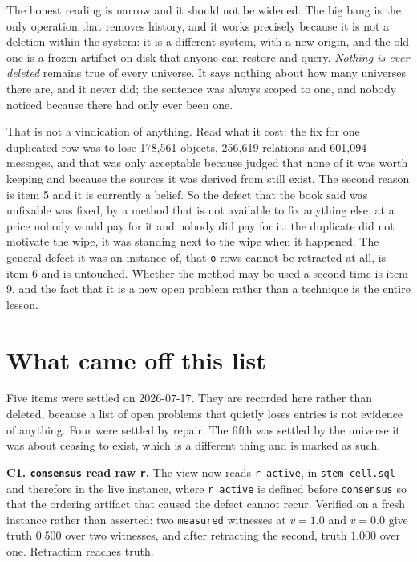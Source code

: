 The honest reading is narrow and it should not be widened. The big bang is the only operation that removes history, and it works precisely because it is not a deletion within the system: it is a different system, with a new origin, and the old one is a frozen artifact on disk that anyone can restore and query. \textit{Nothing is ever deleted} remains true of every universe. It says nothing about how many universes there are, and it never did; the sentence was always scoped to one, and nobody noticed because there had only ever been one.

That is not a vindication of anything. Read what it cost: the fix for one duplicated row was to lose 178,561 objects, 256,619 relations and 601,094 messages, and that was only acceptable because \labPI{} judged that none of it was worth keeping and because the sources it was derived from still exist. The second reason is item 5 and it is currently a belief. So the defect that the book said was unfixable was fixed, by a method that is not available to fix anything else, at a price nobody would pay for it and nobody did pay for it: the duplicate did not motivate the wipe, it was standing next to the wipe when it happened. The general defect it was an instance of, that \texttt{o} rows cannot be retracted at all, is item 6 and is untouched. Whether the method may be used a second time is item 9, and the fact that it is a new open problem rather than a technique is the entire lesson.

\section{What came off this list}

Five items were settled on 2026-07-17. They are recorded here rather than deleted, because a list of open problems that quietly loses entries is not evidence of anything. Four were settled by repair. The fifth was settled by the universe it was about ceasing to exist, which is a different thing and is marked as such.

\textbf{C1. \texttt{consensus} read raw \texttt{r}.} The view now reads \texttt{r\_active}, in \texttt{stem-cell.sql} and therefore in the live instance, where \texttt{r\_active} is defined before \texttt{consensus} so that the ordering artifact that caused the defect cannot recur. Verified on a fresh instance rather than asserted: two \texttt{measured} witnesses at $v=1.0$ and $v=0.0$ give truth $0.500$ over two witnesses, and after retracting the second, truth $1.000$ over one. Retraction reaches truth.

